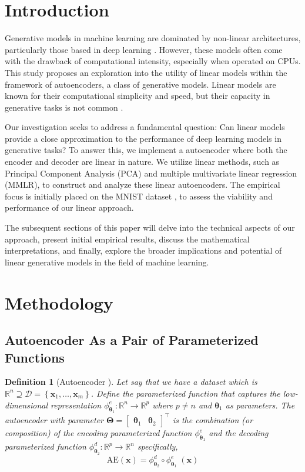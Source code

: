 \documentclass[12pt]{article}
\newtheorem{definition}{Definition}
\begin{document}
\section{Introduction}\label{intro}

Generative models in machine learning are dominated by non-linear architectures, particularly those based in deep learning \citep{cvae, gan, score, denoise}. However, these models often come with the drawback of computational intensity, especially when operated on CPUs. This study proposes an exploration into the utility of linear models within the framework of autoencoders, a class of generative models. Linear models are known for their computational simplicity and speed, but their capacity in generative tasks is not common \citep{elbo}.

Our investigation seeks to address a fundamental question: Can linear models provide a close approximation to the performance of deep learning models in generative tasks? To answer this, we implement a autoencoder where both the encoder and decoder are linear in nature. We utilize linear methods, such as Principal Component Analysis (PCA) and multiple multivariate linear regression (MMLR), to construct and analyze these linear autoencoders. The empirical focus is initially placed on the MNIST dataset \citep{mnist}, to assess the viability and performance of our linear approach.

The subsequent sections of this paper will delve into the technical aspects of our approach, present initial empirical results, discuss the mathematical interpretations, and finally, explore the broader implications and potential of linear generative models in the field of machine learning.
 
\section{Methodology}
\subsection{Autoencoder As a Pair of Parameterized Functions}
\begin{definition}[Autoencoder \citep{ae}]
Let say that we have a dataset which is $\mathbb{R}^{n} \supseteq \mathcal{D} = \left\{\mathbf{x}_1,\dots,\mathbf{x}_m\right\}$. Define the parameterized function that captures the low-dimensional representation $\phi_{\boldsymbol{\theta}_1}^{e}:\mathbb{R}^n\rightarrow \mathbb{R}^{p}$ where $p \neq n$ and $\boldsymbol{\theta}_1$ as parameters. The autoencoder with parameter $\boldsymbol{\Theta} = \begin{bmatrix}
    \boldsymbol{\theta}_1 & \boldsymbol{\theta}_2
\end{bmatrix}^\top$
is the combination (or composition) of the encoding parameterized function $\phi_{\boldsymbol{\theta}_1}^e$ and the decoding parameterized function $\phi_{\boldsymbol{\theta}_2}^{d}: \mathbb{R}^p\rightarrow\mathbb{R}^n$ specifically,
$$
\text{AE}(\mathbf{x}) = \phi_{\boldsymbol{\theta}_2}^d \circ \phi_{\boldsymbol{\theta}_1}^e \; (\mathbf{x})$$
\end{definition}
\end{document}
